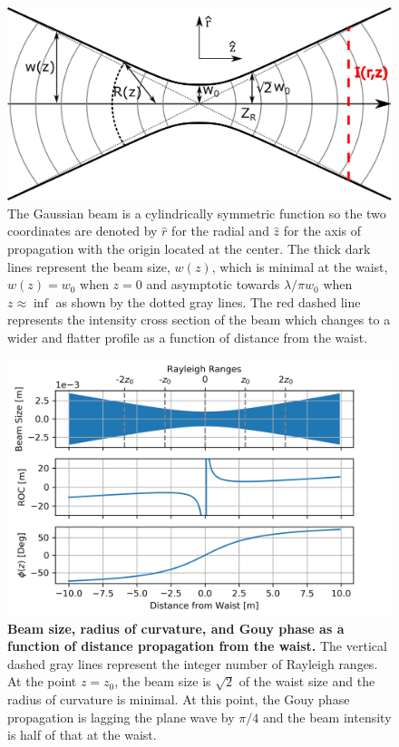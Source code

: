 		\begin{figure}[ht]
			\centering
			\includegraphics[width=0.65 \textwidth]{../Figures/GaussProfile.png}
			\caption{The Gaussian beam is a cylindrically symmetric function so the two coordinates are denoted by $\hat{r}$ for the radial and $\hat{z}$ for the axis of propagation with the origin located at the center. The thick dark lines represent the beam size, $w(z)$, which is minimal at the waist, $w(z)=w_0$ when $z=0$ and asymptotic towards $\lambda/\pi w_0$ when $z \approx \inf$ as shown by the dotted gray lines. The red dashed line represents the intensity cross section of the beam which changes to a wider and flatter profile as a function of distance from the waist.}
			\label{fig:GaussProfile}
		\end{figure}
	
		\begin{figure}[ht]
			\centering
			\includegraphics[width=0.85 \textwidth]{../Figures/GaussBeamParams.png}
			\caption[Beam size, radius of curvature, and Gouy phase as a function of distance propagation from the waist.] 
			{\textbf{Beam size, radius of curvature, and Gouy phase as a function of distance propagation from the waist.} The vertical dashed gray lines represent the integer number of Rayleigh ranges.  At the point $z=z_0$, the beam size is $\sqrt{2}$ of the waist size and the radius of curvature is minimal.  At this point, the Gouy phase propagation is lagging the plane wave by $\pi /4$ and the beam intensity is half of that at the waist.}
			\label{fig:GaussParams}
		\end{figure}

